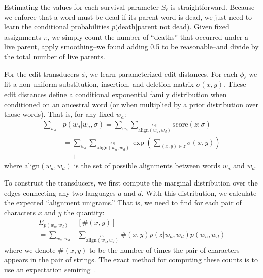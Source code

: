 \documentclass[11pt,a4paper]{article}
\begin{document}
Estimating the values for each survival parameter $S_\ell$ is
straightforward. Because we enforce that a word must be dead if its
parent word is dead, we just need to learn the conditional probabilities
$p($death$|$parent not dead$)$. Given fixed assignments $\pi$, we
simply count the number of ``deaths'' that occurred under a live
parent, apply smoothing--we found adding 0.5 to be reasonable--and
divide by the total number of live parents.

For the edit transducers $\phi$, we learn parameterized edit distances.  For each $\phi_\ell$ we fit a non-uniform
substitution, insertion, and deletion matrix $\sigma(x,y)$. These edit distances
define a conditional exponential family distribution when conditioned
on an ancestral word (or when multiplied by a prior distribution
over those words). That is, for any fixed $w_a$:
\begin{equation}
  \begin{split}
    \sum_{w_d} &p(w_d|w_a,\sigma) = \sum_{w_d} \sum_{\stackrel{z\in}{\scriptscriptstyle\mathrm{align}(w_a,w_d)}} \mathrm{score}(z;\sigma) \\
    &= \sum_{w_d} \sum_{\stackrel{z\in}{\scriptscriptstyle\mathrm{align}(w_a,w_d)}} \exp( \sum_{(x,y)\in z} \sigma(x,y)) \\
     &= 1
   \end{split}
 \end{equation}
where $\mathrm{align}(w_a,w_d)$ is the set of possible alignments between words $w_a$ and $w_d$.

To construct the transducers, we first compute the marginal
distribution over the edges connecting any two languages $a$ and
$d$. With this distribution, we calculate the expected ``alignment
unigrams.'' That is, we need to find for each pair of characters
$x$ and $y$ the quantity:
\begin{equation}
  \begin{split}
    E_{p(w_a,w_d)}&[\#(x,y)] \\ = \sum_{w_a,w_d} &\sum_{\stackrel{z\in}{\scriptscriptstyle\mathrm{align}(w_a,w_d)}} \#(x,y) p(z|w_a,w_d)p(w_a,w_d)
   \end{split}
 \end{equation}
where we denote $\#(x,y)$ to be the number of times the pair of characters
appears in the pair of strings. The exact method for computing
these counts is to use an expectation semiring~\cite{eisner2001expectation}.
\end{document}

